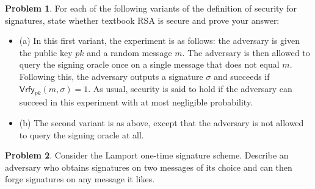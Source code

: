 \documentclass[11pt]{article}
\theoremstyle{definition}
\newtheorem{problem}{Problem}
\begin{document}





\begin{problem}
For each of the following variants of the definition of security for signatures, state whether textbook RSA is secure and prove your answer: 
\begin{itemize}
\item (a) In this first variant, the experiment is as follows: the adversary is given the public key $pk$ and a random message $m$. The adversary is then allowed to query the signing oracle once on a single message that does not equal $m$. Following this, the adversary outputs a signature $\sigma$ and succeeds if $\mathsf{Vrfy}_{pk}(m,\sigma)=1$. As usual, security is said to hold if the adversary can succeed in this experiment with at most negligible probability.	
\item (b) The second variant is as above, except that the adversary is not allowed to query the signing oracle at all.
\end{itemize}
\end{problem}

\begin{problem}
Consider the Lamport one-time signature scheme. Describe an adversary who obtains signatures on two messages of its choice and can then forge signatures on any message it likes.
\end{problem}
\end{document}
